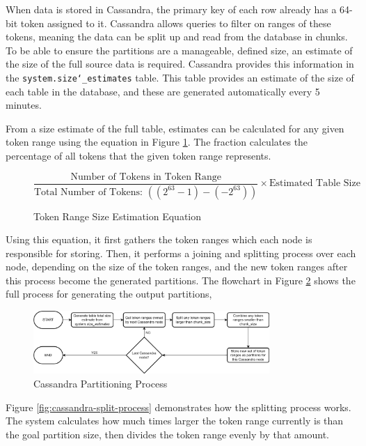 When data is stored in Cassandra, the primary key of each row already has a 64-bit token assigned to it. Cassandra allows queries to filter on ranges of these tokens, meaning the data can be split up and read from the database in chunks. To be able to ensure the partitions are a manageable, defined size, an estimate of the size of the full source data is required. Cassandra provides this information in the \texttt{system.size\char`_estimates} table. This table provides an estimate of the size of each table in the database, and these are generated automatically every 5 minutes.

From a size estimate of the full table, estimates can be calculated for any given token range using the equation in Figure \ref{fig:token-range-estimation}. The fraction calculates the percentage of all tokens that the given token range represents.

\begin{figure}[h]
	\centering
	\[ \frac{\text{Number of Tokens in Token Range}}{\text{Total Number of Tokens: } ((2^{63}-1) - (-2^{63}))} \times \text{Estimated Table Size} \]
	\caption{Token Range Size Estimation Equation}
	\label{fig:token-range-estimation}
\end{figure}

Using this equation, it first gathers the token ranges which each node is responsible for storing. Then, it performs a joining and splitting process over each node, depending on the size of the token ranges, and the new token ranges after this process become the generated partitions. The flowchart in Figure \ref{fig:cassandra-partitioning-decision-tree} shows the full process for generating the output partitions, 

\begin{figure}[h]
	\centering
	\includegraphics[width=0.8\textwidth]{chapters/diagrams/implementation/cassandra-partitioning-decision-tree}
	\caption{Cassandra Partitioning Process}
	\label{fig:cassandra-partitioning-decision-tree}
\end{figure}


Figure \ref{fig:cassandra-split-process} demonstrates how the splitting process works. The system calculates how much times larger the token range currently is than the goal partition size, then divides the token range evenly by that amount.

